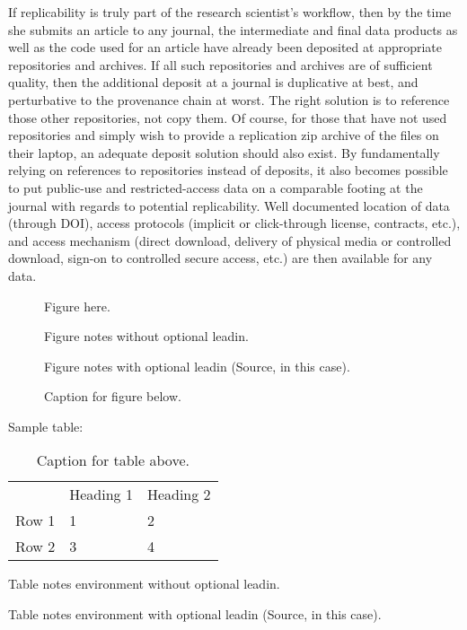 \documentclass[AEJ]{AEA}
\begin{document}
If replicability is truly part of the research scientist's workflow, then by the time she submits an article to any journal, the intermediate and final data products as well as the code used for an article have already been deposited at appropriate repositories and archives. If all such repositories and archives are of sufficient quality, then the additional deposit at a journal is duplicative at best, and perturbative to the provenance chain at worst. The right solution is to reference those other repositories, not copy them. Of course, for those that have not used repositories and simply wish to provide a replication zip archive of the files on their laptop, an adequate deposit solution should also exist.
By fundamentally relying on references to repositories instead of deposits, it also becomes possible to put public-use and restricted-access data on a comparable footing at the journal with regards to potential replicability. Well documented location of data (through DOI), access protocols (implicit or click-through license, contracts, etc.), and access mechanism (direct download, delivery of physical media or controlled download, sign-on to controlled secure access, etc.) are then available for any data.

\begin{figure}
Figure here.

\caption{Caption for figure below.}
\begin{figurenotes}
Figure notes without optional leadin.
\end{figurenotes}
\begin{figurenotes}[Source]
Figure notes with optional leadin (Source, in this case).
\end{figurenotes}
\end{figure}

Sample table:

\begin{table}
\caption{Caption for table above.}

\begin{tabular}{lll}
& Heading 1 & Heading 2 \\ 
Row 1 & 1 & 2 \\ 
Row 2 & 3 & 4%
\end{tabular}
\begin{tablenotes}
Table notes environment without optional leadin.
\end{tablenotes}
\begin{tablenotes}[Source]
Table notes environment with optional leadin (Source, in this case).
\end{tablenotes}
\end{table}
\end{document}
